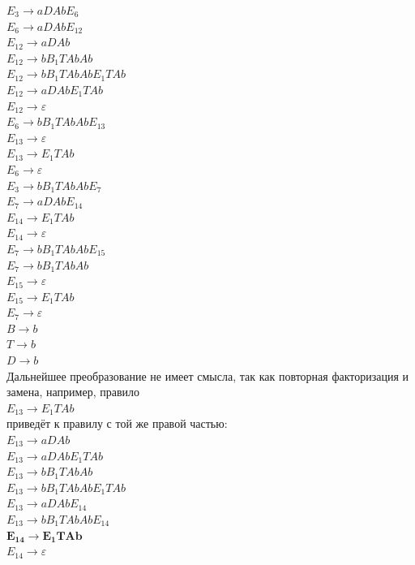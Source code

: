 \documentclass[a4paper,14pt]{extarticle}
\begin{document}
\begin{enumerate}[1.]
$E_3 \rightarrow aDAbE_6$\\
$E_6 \rightarrow aDAbE_{12}$\\ 
$E_{12} \rightarrow aDAb$\\
$E_{12} \rightarrow bB_1TAbAb$\\
$E_{12} \rightarrow bB_1TAbAbE_1TAb$\\
$E_{12} \rightarrow aDAbE_1TAb$\\
$E_{12} \rightarrow \varepsilon$\\
$E_6 \rightarrow bB_1TAbAbE_{13}$\\ 
$E_{13} \rightarrow \varepsilon$\\ 
$E_{13} \rightarrow E_1TAb$\\
$E_6 \rightarrow \varepsilon$\\ 
$E_3 \rightarrow bB_1TAbAbE_7$\\
$E_7 \rightarrow aDAbE_{14}$\\
$E_{14} \rightarrow E_1TAb$\\
$E_{14} \rightarrow \varepsilon$\\
$E_7 \rightarrow bB_1TAbAbE_{15}$\\
$E_7 \rightarrow bB_1TAbAb$\\
$E_{15} \rightarrow \varepsilon$\\
$E_{15} \rightarrow E_1TAb$\\
$E_7 \rightarrow \varepsilon$\\
$B \rightarrow b$\\
$T \rightarrow b$\\
$D \rightarrow b$\\

Дальнейшее преобразование не имеет смысла, так как 
повторная факторизация и замена, например, правило\\
$E_{13} \rightarrow E_1TAb$\\
приведёт к правилу с той же правой частью:\\
$E_{13} \rightarrow aDAb$\\
$E_{13} \rightarrow aDAbE_1TAb$\\
$E_{13} \rightarrow bB_1TAbAb$\\
$E_{13} \rightarrow bB_1TAbAbE_1TAb$\\

$E_{13} \rightarrow aDAbE_{14}$\\
$E_{13} \rightarrow bB_1TAbAbE_{14}$\\
$\mathbf{E_{14} \rightarrow E_1TAb}$\\
$E_{14} \rightarrow \varepsilon$\\


\end{enumerate}
\end{document}
